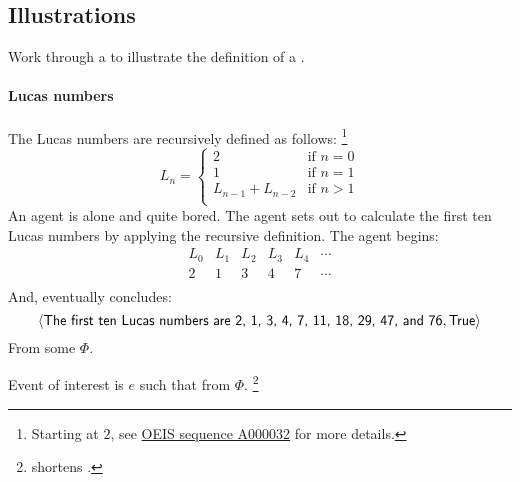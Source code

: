 \subsection{Illustrations}
\label{sec:illustrations}

\begin{note}
  Work through a \scen{} to illustrate the definition of a \requ{}.
\end{note}

\paragraph*{Lucas numbers}

\begin{note}
  \begin{scenario}%
    \label{scen:LucasNums}%
    The Lucas numbers are recursively defined as follows:%
    \footnote{
      Starting at \(2\), see \hyperlink{cite.OEIS.:aa}{OEIS sequence A000032} for more details.
    }
    \[
      L_{n} = \left\{
        \begin{array}{ll}
          2 & \text{if } n = 0 \\
          1 & \text{if } n = 1 \\
          L_{n-1} + L_{n-2} & \text{if } n > 1 \\
        \end{array}
      \right.
    \]
    An agent is alone and quite bored.
    The agent sets out to calculate the first ten Lucas numbers by applying the recursive definition.
    The agent begins:
    \[
      \begin{array}{cccccc}
        L_{0} & L_{1} & L_{2} & L_{3} & L_{4} & \cdots \\
        \hline
        2 & 1 & 3 & 4 & 7 & \cdots \\
      \end{array}
    \]
    And, eventually concludes:
    \[
      \pv{\propI{The first ten Lucas numbers are 2, 1, 3, 4, 7, 11, 18, 29, 47, and 76}}{\valI{True}}
    \]
    From some \pool{} \(\Phi\).
  \end{scenario}

  Event of interest is \(e\) such that  from \(\Phi\).%
  \footnote{
     shortens .
  }


\end{note}
